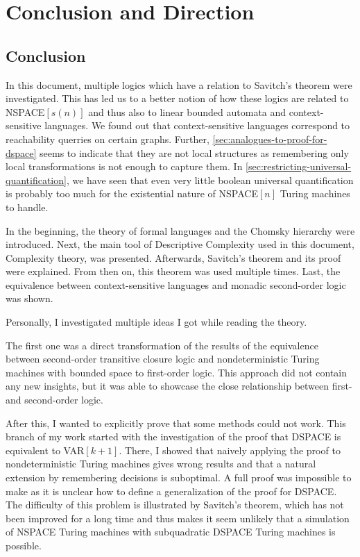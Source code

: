 
\chapter{Conclusion and Direction}\label{ch:conclusion-and-direction}

\section{Conclusion}\label{sec:conclusion}
In this document, multiple logics which have a relation to Savitch's theorem were investigated.
This has led us to a better notion of how these logics are related to \acs{NSPACE}$[s(n)]$ and thus also to linear bounded automata and context-sensitive languages.
We found out that context-sensitive languages correspond to reachability querries on certain graphs.
Further, \cref{sec:analogues-to-proof-for-dspace} seems to indicate that they are not local structures as remembering only local transformations is not enough to capture them.
In \cref{sec:restricting-universal-quantification}, we have seen that even very little boolean universal quantification is probably too much for the existential nature of \acs{NSPACE}$[n]$ Turing machines to handle.

In the beginning, the theory of formal languages and the Chomsky hierarchy were introduced.
Next, the main tool of Descriptive Complexity used in this document, Complexity theory, was presented.
Afterwards, Savitch's theorem and its proof were explained.
From then on, this theorem was used multiple times.
Last, the equivalence between context-sensitive languages and monadic second-order logic was shown.

Personally, I investigated multiple ideas I got while reading the theory.

The first one was a direct transformation of the results of the equivalence between second-order transitive closure logic and nondeterministic Turing machines with bounded space to first-order logic.
This approach did not contain any new insights, but it was able to showcase the close relationship between first- and second-order logic.

After this, I wanted to explicitly prove that some methods could not work.
This branch of my work started with the investigation of the proof that \acs{DSPACE} is equivalent to \acs{VAR}$[k + 1]$.
There, I showed that naively applying the proof to nondeterministic Turing machines gives wrong results and that a natural extension by remembering decisions is suboptimal.
A full proof was impossible to make as it is unclear how to define a generalization of the proof for \acs{DSPACE}\@.
The difficulty of this problem is illustrated by Savitch's theorem, which has not been improved for a long time and thus makes it seem unlikely that a simulation of \acs{NSPACE} Turing machines with subquadratic \acs{DSPACE} Turing machines is possible.


